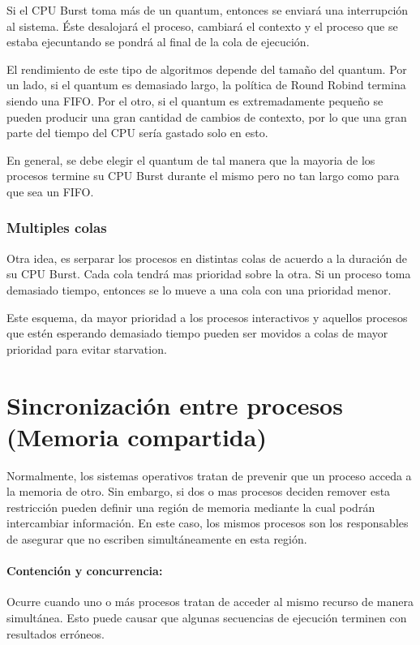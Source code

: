 	Si el CPU Burst toma más de un quantum, entonces se enviará una interrupción al sistema. Éste desalojará el proceso, cambiará el contexto y el proceso que se estaba ejecuntando se pondrá al final de la cola de ejecución.
	
	El rendimiento de este tipo de algoritmos depende del tamaño del quantum. Por un lado, si el quantum es demasiado largo, la política de Round Robind termina siendo una FIFO. Por el otro, si el quantum es extremadamente pequeño se pueden producir una gran cantidad de cambios de contexto, por lo que una gran parte del tiempo del CPU sería gastado solo en esto.
	
	En general, se debe elegir el quantum de tal manera que la mayoria de los procesos termine su CPU Burst durante el mismo pero no tan largo como para que sea un FIFO.
	
	\subsubsection{Multiples colas}
	Otra idea, es serparar los procesos en distintas colas de acuerdo a la duración de su CPU Burst. Cada cola tendrá mas prioridad sobre la otra. Si un proceso toma demasiado tiempo, entonces se lo mueve a una cola con una prioridad menor. 
	
	Este esquema, da mayor prioridad a los procesos interactivos y aquellos procesos que estén esperando demasiado tiempo pueden ser movidos a colas de mayor prioridad para evitar starvation.

\newpage
\section{Sincronización entre procesos (Memoria compartida)}
Normalmente, los sistemas operativos tratan de prevenir que un proceso acceda a la memoria de otro. Sin embargo, si dos o mas procesos deciden remover esta restricción pueden definir una región de memoria mediante la cual podrán intercambiar información. En este caso, los mismos procesos son los responsables de asegurar que no escriben simultáneamente en esta región.

\paragraph{Contención y concurrencia:} Ocurre cuando uno o más procesos tratan de acceder al mismo recurso de manera simultánea. Esto puede causar que algunas secuencias de ejecución terminen con resultados erróneos.

